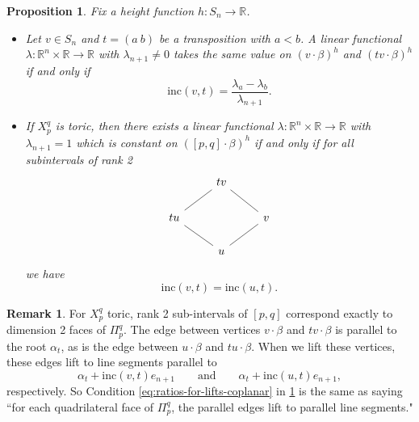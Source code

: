 \documentclass[11pt]{amsart}
\newtheorem{proposition}[Thm]{Proposition}
\theoremstyle{definition}
\newtheorem{remark}[Thm]{Remark}
\newcommand{\RR}{\mathbb{R}}
\def\lin{\lambda}
\def\hgt{h}
\def\pt{\beta}
\def\steep{{\mathrm {inc}}}
\begin{document}
\begin{proposition}\label{prop:ratios-for-coplanarity}
	Fix a height function $\hgt:S_n \to \RR$.
	\begin{itemize}
		\item 	 Let $v \in S_n$ and $t=(a~b)$ be a transposition with $a<b$. A linear functional $\lin: \RR^n \times \RR \to \RR$ with $\lin_{n+1} \neq 0$ takes the same value on $(v \cdot \pt)^\hgt$ and $(tv \cdot \pt)^\hgt$ if and only if
		\[\steep(v,t)= \frac{\lin_a-\lin_b}{\lin_{n+1}}.\]
		\item 	If $X_p^q$ is toric, then there exists a linear functional $\lambda: \RR^n \times \RR \to \RR$ with $\lin_{n+1} =1$ which is constant on $([p,q] \cdot \pt)^{\hgt}$ if and only if for all subintervals of rank 2
				\[\begin{tikzcd}
			& {tv} \\
			{tu} && v \\
			& u
			\arrow[no head, from=1-2, to=2-3]
			\arrow[no head, from=2-1, to=1-2]
			\arrow[no head, from=2-3, to=3-2]
			\arrow[no head, from=3-2, to=2-1]
		\end{tikzcd}\]
	 we have
		\begin{equation}\label{eq:ratios-for-lifts-coplanar}
			\steep(v,t) = \steep(u,t).
		\end{equation}
	\end{itemize}
\end{proposition}

\begin{remark}
	For $X_p^q$ toric, rank 2 sub-intervals of $[p,q]$ correspond exactly to dimension 2 faces of $\Pi_p^q$. The edge between vertices 
	$v \cdot \pt$ and $tv \cdot \pt$ is parallel to the root $\alpha_t$, as is the edge between $u \cdot \pt$ and $tu \cdot \pt$. When we lift these vertices, these edges lift to line segments parallel to 
	\[\alpha_t + \steep(v,t)  e_{n+1} \qquad \text{and}\qquad \alpha_t + \steep(u,t)  e_{n+1},\]
	respectively. 
	So Condition \eqref{eq:ratios-for-lifts-coplanar} in \cref{prop:ratios-for-coplanarity} is the same as saying ``for each quadrilateral face of $\Pi_p^q$, the parallel edges lift to parallel line segments."
\end{remark}
\end{document}
